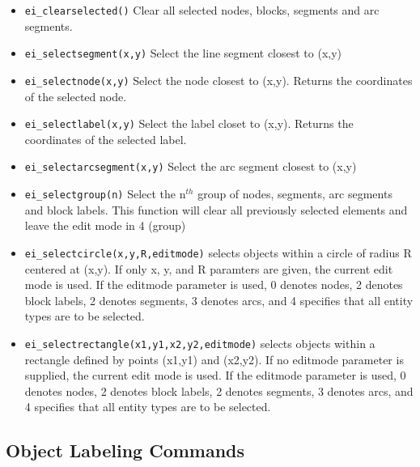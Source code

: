 \begin{itemize}
\item {\tt ei\_clearselected()} Clear all selected nodes, blocks, segments and arc
segments.

\item {\tt ei\_selectsegment(x,y)} Select the line segment closest to (x,y)

\item {\tt ei\_selectnode(x,y)} Select the node closest to (x,y).
Returns the coordinates of the selected node.

\item {\tt ei\_selectlabel(x,y)} Select the label closet to (x,y).
Returns the coordinates of the selected label.

\item {\tt ei\_selectarcsegment(x,y)} Select the arc segment closest to (x,y)

\item {\tt ei\_selectgroup(n)} Select the n$^{th}$ group of nodes, segments, arc
segments and block labels. This function will clear all previously selected
elements and leave the edit mode in 4 (group)

\item{\tt ei\_selectcircle(x,y,R,editmode)} selects objects within a circle of radius
R centered at (x,y).  If only x, y, and R paramters are given, the current
edit mode is used.  If the editmode parameter is used, 0 denotes nodes, 2
denotes block labels, 2 denotes segments, 3 denotes arcs, and 4 specifies
that all entity types are to be selected.

\item{\tt ei\_selectrectangle(x1,y1,x2,y2,editmode)} selects objects within a rectangle
defined by points (x1,y1) and (x2,y2). If no editmode parameter is supplied,
the current edit mode is used.  If the editmode parameter is used, 0 denotes
nodes, 2 denotes block labels, 2 denotes segments, 3 denotes arcs, and 4 
specifies that all entity types are to be selected.
\end{itemize}


\subsection{Object Labeling Commands}

